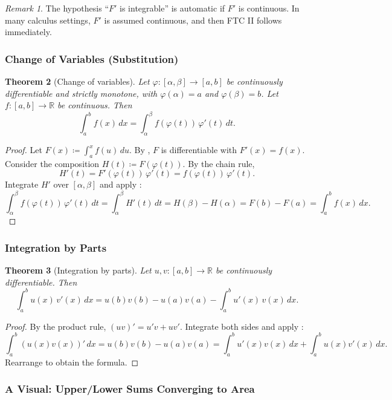 \documentclass[12pt]{article}
\numberwithin{equation}{section}
\def\diff{d}
\newcommand{\RR}{\mathbb{R}}
\newcommand{\diff}{\mathop{}\!\mathrm{d}}    %
\theoremstyle{plain}
\newtheorem{theorem}{Theorem}[section]
\theoremstyle{definition}
\theoremstyle{remark}
\newtheorem{remark}[theorem]{Remark}
\begin{document}
\begin{remark}
The hypothesis ``$F'$ is integrable'' is automatic if $F'$ is continuous.
In many calculus settings, $F'$ is assumed continuous, and then FTC II follows immediately.
\end{remark}

\subsubsection{Change of Variables (Substitution)}

\begin{theorem}[Change of variables]\label{thm:substitution}
Let $\varphi:[\alpha,\beta]\to[a,b]$ be continuously differentiable and strictly monotone, with $\varphi(\alpha)=a$ and $\varphi(\beta)=b$.
Let $f:[a,b]\to\RR$ be continuous.
Then
\[
\int_a^b f(x)\,\diff x = \int_\alpha^\beta f(\varphi(t))\,\varphi'(t)\,\diff t.
\]
\end{theorem}

\begin{proof}
Let $F(x)\coloneqq \int_a^x f(u)\,\diff u$. By , $F$ is differentiable with $F'(x)=f(x)$.
Consider the composition $H(t)\coloneqq F(\varphi(t))$.
By the chain rule,
\[
H'(t)=F'(\varphi(t))\,\varphi'(t)=f(\varphi(t))\,\varphi'(t).
\]
Integrate $H'$ over $[\alpha,\beta]$ and apply :
\[
\int_\alpha^\beta f(\varphi(t))\,\varphi'(t)\,\diff t
=
\int_\alpha^\beta H'(t)\,\diff t
=
H(\beta)-H(\alpha)
=
F(b)-F(a)
=
\int_a^b f(x)\,\diff x.
\]
\end{proof}

\subsubsection{Integration by Parts}

\begin{theorem}[Integration by parts]\label{thm:ibp}
Let $u,v:[a,b]\to\RR$ be continuously differentiable.
Then
\[
\int_a^b u(x)\,v'(x)\,\diff x
=
u(b)v(b)-u(a)v(a) - \int_a^b u'(x)\,v(x)\,\diff x.
\]
\end{theorem}

\begin{proof}
By the product rule, $(uv)'=u'v+uv'$.
Integrate both sides and apply :
\[
\int_a^b (u(x)v(x))'\,\diff x = u(b)v(b)-u(a)v(a)
=
\int_a^b u'(x)v(x)\,\diff x+\int_a^b u(x)v'(x)\,\diff x.
\]
Rearrange to obtain the formula.
\end{proof}

\subsubsection{A Visual: Upper/Lower Sums Converging to Area}
\end{document}
